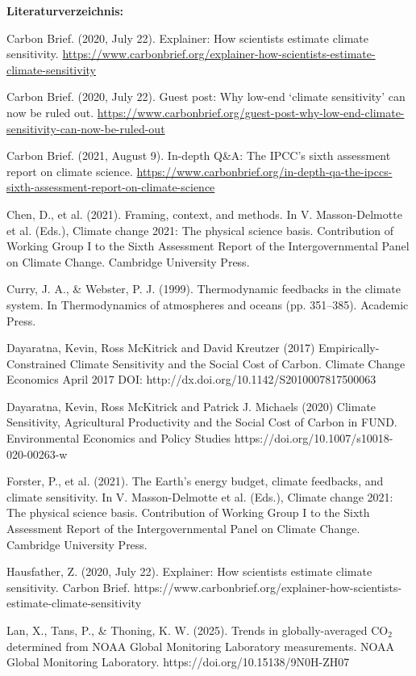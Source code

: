 \documentclass[12pt,paper=a4,DIV=12,parskip=never,chapterprefix=false,headings=standardclasses]{scrreprt}
\begin{document}
\vfill
\noindent\textbf{Literaturverzeichnis:}

\begingroup
\parindent=0pt
\everypar{\hangindent=2em\hangafter=1\relax}

Carbon Brief. (2020, July 22). Explainer: How scientists estimate climate sensitivity.
\url{https://www.carbonbrief.org/explainer-how-scientists-estimate-climate-sensitivity}

Carbon Brief. (2020, July 22). Guest post: Why low-end ‘climate sensitivity’ can now be ruled out.
\url{https://www.carbonbrief.org/guest-post-why-low-end-climate-sensitivity-can-now-be-ruled-out}

Carbon Brief. (2021, August 9). In-depth Q\&A: The IPCC’s sixth assessment report on climate science.
\url{https://www.carbonbrief.org/in-depth-qa-the-ipccs-sixth-assessment-report-on-climate-science}

Chen, D., et al. (2021). Framing, context, and methods. In V. Masson-Delmotte et al. (Eds.), Climate
change 2021: The physical science basis. Contribution of Working Group I to the Sixth Assessment
Report of the Intergovernmental Panel on Climate Change. Cambridge University Press.

Curry, J. A., \& Webster, P. J. (1999). Thermodynamic feedbacks in the climate system. In
Thermodynamics of atmospheres and oceans (pp. 351–385). Academic Press.

Dayaratna, Kevin, Ross McKitrick and David Kreutzer (2017) Empirically-Constrained Climate Sensitivity
and the Social Cost of Carbon. Climate Change Economics April 2017 DOI:
http://dx.doi.org/10.1142/S2010007817500063

Dayaratna, Kevin, Ross McKitrick and Patrick J. Michaels (2020) Climate Sensitivity, Agricultural
Productivity and the Social Cost of Carbon in FUND. Environmental Economics and Policy Studies
https://doi.org/10.1007/s10018-020-00263-w

Forster, P., et al. (2021). The Earth's energy budget, climate feedbacks, and climate sensitivity. In V.
Masson-Delmotte et al. (Eds.), Climate change 2021: The physical science basis. Contribution of
Working Group I to the Sixth Assessment Report of the Intergovernmental Panel on Climate Change.
Cambridge University Press.

Hausfather, Z. (2020, July 22). Explainer: How scientists estimate climate sensitivity. Carbon Brief.
https://www.carbonbrief.org/explainer-how-scientists-estimate-climate-sensitivity

Lan, X., Tans, P., \& Thoning, K. W. (2025). Trends in globally-averaged CO$_2$ determined from NOAA
Global Monitoring Laboratory measurements. NOAA Global Monitoring Laboratory.
https://doi.org/10.15138/9N0H-ZH07
\end{document}
